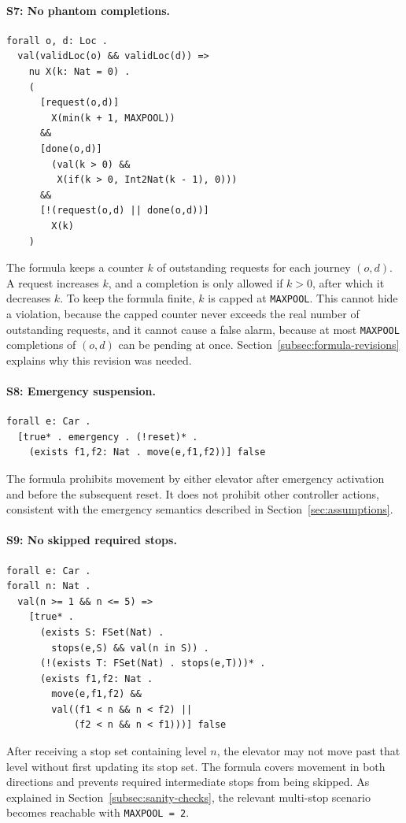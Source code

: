 \paragraph{S7: No phantom completions.}
\noindent \begin{lstlisting}
forall o, d: Loc .
  val(validLoc(o) && validLoc(d)) =>
    nu X(k: Nat = 0) .
    (
      [request(o,d)]
        X(min(k + 1, MAXPOOL))
      &&
      [done(o,d)]
        (val(k > 0) &&
         X(if(k > 0, Int2Nat(k - 1), 0)))
      &&
      [!(request(o,d) || done(o,d))]
        X(k)
    )
\end{lstlisting}
The formula keeps a counter \(k\) of outstanding requests for each journey \((o,d)\). A request increases \(k\), and a completion is only allowed if \(k>0\), after which it decreases \(k\). To keep the formula finite, \(k\) is capped at \texttt{MAXPOOL}. This cannot hide a violation, because the capped counter never exceeds the real number of outstanding requests, and it cannot cause a false alarm, because at most \texttt{MAXPOOL} completions of \((o,d)\) can be pending at once. Section~\ref{subsec:formula-revisions} explains why this revision was needed.

\paragraph{S8: Emergency suspension.}
\noindent \begin{lstlisting}
forall e: Car .
  [true* . emergency . (!reset)* .
    (exists f1,f2: Nat . move(e,f1,f2))] false
\end{lstlisting}
The formula prohibits movement by either elevator after emergency activation and before the subsequent reset. It does not prohibit other controller actions, consistent with the emergency semantics described in Section~\ref{sec:assumptions}.

\paragraph{S9: No skipped required stops.}

\noindent \begin{lstlisting}
forall e: Car .
forall n: Nat .
  val(n >= 1 && n <= 5) =>
    [true* .
      (exists S: FSet(Nat) .
        stops(e,S) && val(n in S)) .
      (!(exists T: FSet(Nat) . stops(e,T)))* .
      (exists f1,f2: Nat .
        move(e,f1,f2) &&
        val((f1 < n && n < f2) ||
            (f2 < n && n < f1)))] false
\end{lstlisting}
After receiving a stop set containing level \(n\), the elevator may not move past that level without first updating its stop set. The formula covers movement in both directions and prevents required intermediate stops from being skipped. As explained in Section~\ref{subsec:sanity-checks}, the relevant multi-stop scenario becomes reachable with \texttt{MAXPOOL = 2}.

